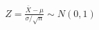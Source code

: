 \documentclass[preview]{standalone}
\begin{document}
\begin{align*}
Z = \frac{\bar{X} - \mu}{\sigma / \sqrt{n}} \sim N(0, 1)
\end{align*}
\end{document}

